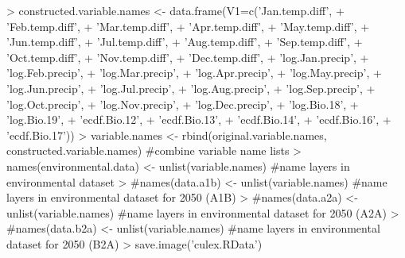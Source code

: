 \documentclass[10pt]{article}
\renewenvironment{Schunk}{\vspace{\topsep}}{\vspace{\topsep}}
\begin{document}
\begin{Schunk}
\begin{Sinput}
> constructed.variable.names <- data.frame(V1=c('Jan.temp.diff',
+                                               'Feb.temp.diff',
+                                               'Mar.temp.diff',
+                                               'Apr.temp.diff',
+                                               'May.temp.diff',
+                                               'Jun.temp.diff',
+                                               'Jul.temp.diff',
+                                               'Aug.temp.diff',
+                                               'Sep.temp.diff',
+                                               'Oct.temp.diff',
+                                               'Nov.temp.diff',
+                                               'Dec.temp.diff', 
+                                               'log.Jan.precip',
+                                               'log.Feb.precip',
+                                               'log.Mar.precip',
+                                               'log.Apr.precip',
+                                               'log.May.precip',
+                                               'log.Jun.precip',
+                                               'log.Jul.precip',
+                                               'log.Aug.precip',
+                                               'log.Sep.precip',
+                                               'log.Oct.precip',
+                                               'log.Nov.precip',
+                                               'log.Dec.precip',
+                                               'log.Bio.18',
+                                               'log.Bio.19',
+                                               'ecdf.Bio.12',
+                                               'ecdf.Bio.13',
+                                               'ecdf.Bio.14',
+                                               'ecdf.Bio.16',
+                                               'ecdf.Bio.17'))
> variable.names <- rbind(original.variable.names, constructed.variable.names)   #combine variable name lists
> names(environmental.data) <- unlist(variable.names)                       #name layers in environmental dataset
> #names(data.a1b) <- unlist(variable.names)                  #name layers in environmental dataset for 2050 (A1B)
> #names(data.a2a) <- unlist(variable.names)                  #name layers in environmental dataset for 2050 (A2A)
> #names(data.b2a) <- unlist(variable.names)                  #name layers in environmental dataset for 2050 (B2A)
> save.image('culex.RData')
\end{Sinput}
\end{Schunk}
\end{document}
